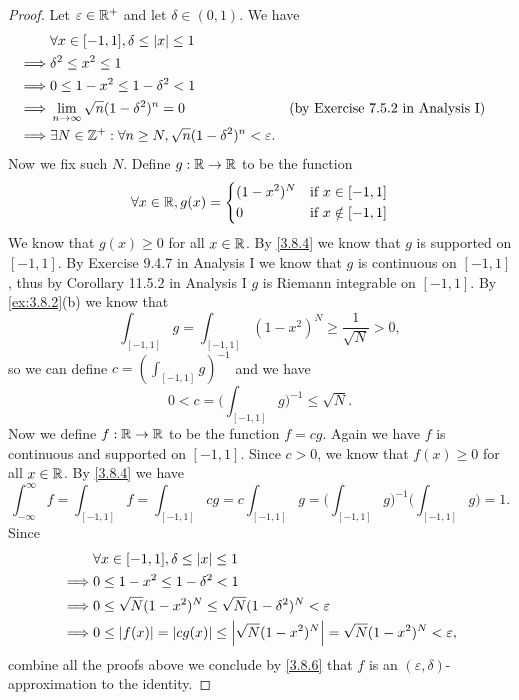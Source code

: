 \begin{proof}
  Let \(\varepsilon \in \mathbb{R}^+\) and let \(\delta \in (0, 1)\).
  We have
  \begin{align*}
             & \forall x \in [-1, 1], \delta \leq \left\lvert x\right\rvert \leq 1                                                                             \\
    \implies & \delta^2 \leq x^2 \leq 1                                                                                                      \\
    \implies & 0 \leq 1 - x^2 \leq 1 - \delta^2 < 1                                                                                          \\
    \implies & \lim_{n \to \infty} \sqrt{n} (1 - \delta^2)^n = 0                               &  & \text{(by Exercise 7.5.2 in Analysis I)} \\
    \implies & \exists N \in \mathbb{Z}^+ : \forall n \geq N, \sqrt{n} (1 - \delta^2)^n < \varepsilon.
  \end{align*}
  Now we fix such \(N\).
  Define \(g : \mathbb{R} \to \mathbb{R}\) to be the function
  \[
    \forall x \in \mathbb{R}, g(x) = \begin{dcases}
      (1 - x^2)^N & \text{if } x \in [-1, 1]    \\
      0           & \text{if } x \notin [-1, 1]
    \end{dcases}
  \]
  We know that \(g(x) \geq 0\) for all \(x \in \mathbb{R}\).
  By \cref{3.8.4} we know that \(g\) is supported on \([-1, 1]\).
  By Exercise 9.4.7 in Analysis I we know that \(g\) is continuous on \([-1, 1]\), thus by Corollary 11.5.2 in Analysis I \(g\) is Riemann integrable on \([-1, 1]\).
  By \cref{ex:3.8.2}(b) we know that
  \[
    \int_{[-1, 1]} g = \int_{[-1, 1]} (1 - x^2)^N \geq \dfrac{1}{\sqrt{N}} > 0,
  \]
  so we can define \(c = (\int_{[-1, 1]} g)^{-1}\) and we have
  \[
    0 < c = \bigg(\int_{[-1, 1]} g\bigg)^{-1} \leq \sqrt{N}.
  \]
  Now we define \(f : \mathbb{R} \to \mathbb{R}\) to be the function \(f = cg\).
  Again we have \(f\) is continuous and supported on \([-1, 1]\).
  Since \(c > 0\), we know that \(f(x) \geq 0\) for all \(x \in \mathbb{R}\).
  By \cref{3.8.4} we have
  \[
    \int_{-\infty}^\infty f = \int_{[-1, 1]} f = \int_{[-1, 1]} cg = c \int_{[-1, 1]} g = \bigg(\int_{[-1, 1]} g\bigg)^{-1} \bigg(\int_{[-1, 1]} g\bigg) = 1.
  \]
  Since
  \begin{align*}
             & \forall x \in [-1, 1], \delta \leq \left\lvert x\right\rvert \leq 1                                                     \\
    \implies & 0 \leq 1 - x^2 \leq 1 - \delta^2 < 1                                                                  \\
    \implies & 0 \leq \sqrt{N} (1 - x^2)^N \leq \sqrt{N} (1 - \delta^2)^N < \varepsilon                              \\
    \implies & 0 \leq \left\lvert f(x)\right\rvert = \left\lvert cg(x)\right\rvert \leq \left\lvert\sqrt{N} (1 - x^2)^N\right\rvert = \sqrt{N} (1 - x^2)^N < \varepsilon,
  \end{align*}
  combine all the proofs above we conclude by \cref{3.8.6} that \(f\) is an \((\varepsilon, \delta)\)-approximation to the identity.
\end{proof}

